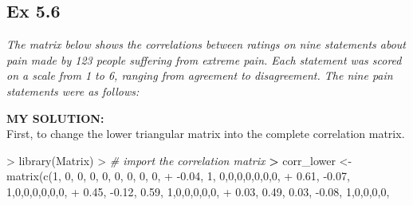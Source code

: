 \documentclass[
]{article}
\newenvironment{Shaded}{\begin{snugshade}}{\end{snugshade}}
\newcommand{\CommentTok}[1]{\textcolor[rgb]{0.56,0.35,0.01}{\textit{#1}}}
\newcommand{\DecValTok}[1]{\textcolor[rgb]{0.00,0.00,0.81}{#1}}
\newcommand{\ErrorTok}[1]{\textcolor[rgb]{0.64,0.00,0.00}{\textbf{#1}}}
\newcommand{\FloatTok}[1]{\textcolor[rgb]{0.00,0.00,0.81}{#1}}
\newcommand{\FunctionTok}[1]{\textcolor[rgb]{0.00,0.00,0.00}{#1}}
\newcommand{\NormalTok}[1]{#1}
\newcommand{\OtherTok}[1]{\textcolor[rgb]{0.56,0.35,0.01}{#1}}
\newcommand{\SpecialCharTok}[1]{\textcolor[rgb]{0.00,0.00,0.00}{#1}}
\begin{document}
\hypertarget{ex-5.6}{%
\subsection{Ex 5.6}\label{ex-5.6}}

\emph{The matrix below shows the correlations between ratings on nine
statements about pain made by 123 people suffering from extreme pain.
Each statement was scored on a scale from 1 to 6, ranging from agreement
to disagreement. The nine pain statements were as follows:}

\textbf{MY SOLUTION:}\\
First, to change the lower triangular matrix into the complete
correlation matrix.

\begin{Shaded}
\begin{Highlighting}[]
\SpecialCharTok{\textgreater{}} \FunctionTok{library}\NormalTok{(Matrix)}
\SpecialCharTok{\textgreater{}} \CommentTok{\# import the correlation matrix}
\ErrorTok{\textgreater{}}\NormalTok{ corr\_lower }\OtherTok{\textless{}{-}} \FunctionTok{matrix}\NormalTok{(}\FunctionTok{c}\NormalTok{(}\DecValTok{1}\NormalTok{, }\DecValTok{0}\NormalTok{, }\DecValTok{0}\NormalTok{, }\DecValTok{0}\NormalTok{, }\DecValTok{0}\NormalTok{, }\DecValTok{0}\NormalTok{, }\DecValTok{0}\NormalTok{, }\DecValTok{0}\NormalTok{, }\DecValTok{0}\NormalTok{,}
\SpecialCharTok{+}                       \SpecialCharTok{{-}}\FloatTok{0.04}\NormalTok{, }\DecValTok{1}\NormalTok{, }\DecValTok{0}\NormalTok{,}\DecValTok{0}\NormalTok{,}\DecValTok{0}\NormalTok{,}\DecValTok{0}\NormalTok{,}\DecValTok{0}\NormalTok{,}\DecValTok{0}\NormalTok{,}\DecValTok{0}\NormalTok{,}
\SpecialCharTok{+}                       \FloatTok{0.61}\NormalTok{, }\SpecialCharTok{{-}}\FloatTok{0.07}\NormalTok{, }\DecValTok{1}\NormalTok{,}\DecValTok{0}\NormalTok{,}\DecValTok{0}\NormalTok{,}\DecValTok{0}\NormalTok{,}\DecValTok{0}\NormalTok{,}\DecValTok{0}\NormalTok{,}\DecValTok{0}\NormalTok{,}
\SpecialCharTok{+}                       \FloatTok{0.45}\NormalTok{, }\SpecialCharTok{{-}}\FloatTok{0.12}\NormalTok{, }\FloatTok{0.59}\NormalTok{, }\DecValTok{1}\NormalTok{,}\DecValTok{0}\NormalTok{,}\DecValTok{0}\NormalTok{,}\DecValTok{0}\NormalTok{,}\DecValTok{0}\NormalTok{,}\DecValTok{0}\NormalTok{,}
\SpecialCharTok{+}                       \FloatTok{0.03}\NormalTok{, }\FloatTok{0.49}\NormalTok{, }\FloatTok{0.03}\NormalTok{, }\SpecialCharTok{{-}}\FloatTok{0.08}\NormalTok{, }\DecValTok{1}\NormalTok{,}\DecValTok{0}\NormalTok{,}\DecValTok{0}\NormalTok{,}\DecValTok{0}\NormalTok{,}\DecValTok{0}\NormalTok{,}

\end{Highlighting}
\end{Shaded}
\end{document}
